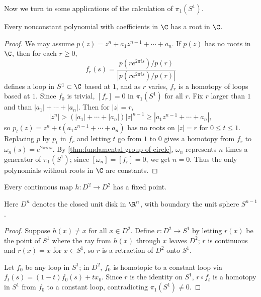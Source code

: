Now we turn to some applications of the calculation of $\pi_1(S^1)$.

\begin{theorem}
\label{thm:fundamental-theorem-of-algebra}
Every nonconstant polynomial with coefficients in $\C$ has a root in $\C$.
\end{theorem}

\begin{proof}
We may assume $p(z) = z^n + a_1z^{n-1} + \cdots + a_n$. If $p(z)$ has no roots in $\C$,
then for each $r \ge 0$,
\[
f_r(s) = \frac{p(re^{2\pi i s})/p(r)}{|p(re^{2\pi i s})/p(r)|}
\]
defines a loop in $S^1 \subset \C$ based at $1$, and as $r$ varies, $f_r$ is a homotopy of
loops based at $1$. Since $f_0$ is trivial, $[f_r] = 0$ in $\pi_1(S^1)$ for all $r$. Fix $r$ larger
than $1$ and than $|a_1|+\cdots+|a_n|$. Then for $|z|=r$,
\[
|z^n| > (|a_1|+\cdots+|a_n|)|z|^{n-1} \ge |a_1z^{n-1}+\cdots+a_n|,
\]
so $p_t(z) = z^n + t(a_1z^{n-1}+\cdots+a_n)$ has no roots on $|z|=r$ for $0 \le t \le 1$.
Replacing $p$ by $p_t$ in $f_r$ and letting $t$ go from $1$ to $0$ gives a homotopy from
$f_r$ to $\omega_n(s) = e^{2\pi i n s}$. By \cref{thm:fundamental-group-of-circle}, $\omega_n$ represents $n$ times a
generator of $\pi_1(S^1)$; since $[\omega_n] = [f_r] = 0$, we get $n=0$. Thus the only
polynomials without roots in $\C$ are constants.
\end{proof}

\begin{theorem}
\label{thm:brouwer-fixed-point-dim2}
Every continuous map $h : D^2 \to D^2$ has a fixed point.
\end{theorem}

Here $D^n$ denotes the closed unit disk in $\R^n$, with boundary the unit sphere
$S^{n-1}$.

\begin{proof}
Suppose $h(x) \ne x$ for all $x \in D^2$. Define $r : D^2 \to S^1$ by letting $r(x)$ be the
point of $S^1$ where the ray from $h(x)$ through $x$ leaves $D^2$; $r$ is continuous and
$r(x) = x$ for $x \in S^1$, so $r$ is a retraction of $D^2$ onto $S^1$.



Let $f_0$ be any loop in $S^1$; in $D^2$, $f_0$ is homotopic to a constant loop via
$f_t(s) = (1-t)f_0(s)+tx_0$. Since $r$ is the identity on $S^1$, $r\circ f_t$ is a homotopy in
$S^1$ from $f_0$ to a constant loop, contradicting $\pi_1(S^1) \ne 0$.
\end{proof}

